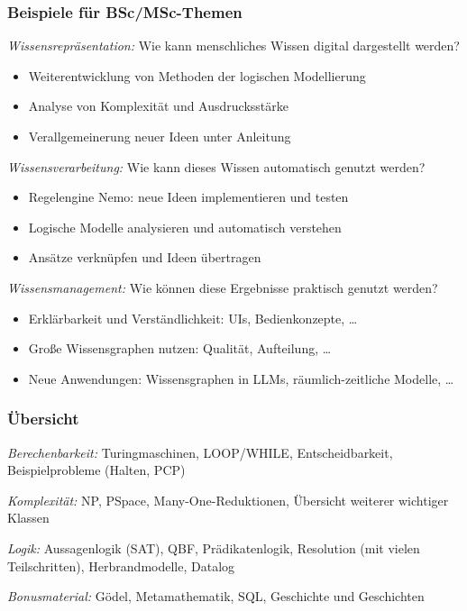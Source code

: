\documentclass[aspectratio=1610,onlymath]{beamer}
\begin{document}
\begin{frame}\frametitle{Beispiele für BSc/MSc-Themen}

\emph{Wissensrepräsentation:} \alert{Wie kann menschliches Wissen digital dargestellt werden?}
\begin{itemize}
\item Weiterentwicklung von Methoden der logischen Modellierung
\item Analyse von Komplexität und Ausdrucksstärke
\item Verallgemeinerung neuer Ideen unter Anleitung
\end{itemize}\medskip

\emph{Wissensverarbeitung:} \alert{Wie kann dieses Wissen automatisch genutzt werden?}
\begin{itemize}
\item Regelengine Nemo: neue Ideen implementieren und testen
\item Logische Modelle analysieren und automatisch verstehen
\item Ansätze verknüpfen und Ideen übertragen
\end{itemize}\medskip

\emph{Wissensmanagement:} \alert{Wie können diese Ergebnisse praktisch genutzt werden?}
\begin{itemize}
\item Erklärbarkeit und Verständlichkeit: UIs, Bedienkonzepte, \ldots
\item Große Wissensgraphen nutzen: Qualität, Aufteilung, \ldots 
\item Neue Anwendungen: Wissensgraphen in LLMs, räumlich-zeitliche Modelle, \ldots
\end{itemize}

\end{frame}



\begin{frame}\frametitle{Übersicht}


\emph{Berechenbarkeit:} Turingmaschinen, LOOP/WHILE, Entscheidbarkeit, Beispielprobleme (Halten, PCP)
\bigskip

\emph{Komplexität:} NP, PSpace, Many-One-Reduktionen, Übersicht weiterer wichtiger Klassen
\bigskip

\emph{Logik:} Aussagenlogik (SAT), QBF, Prädikatenlogik, Resolution (mit vielen Teilschritten), Herbrandmodelle, Datalog
\bigskip

\emph{Bonusmaterial:} Gödel, Metamathematik, SQL, Geschichte und Geschichten

\end{frame}
\end{document}
